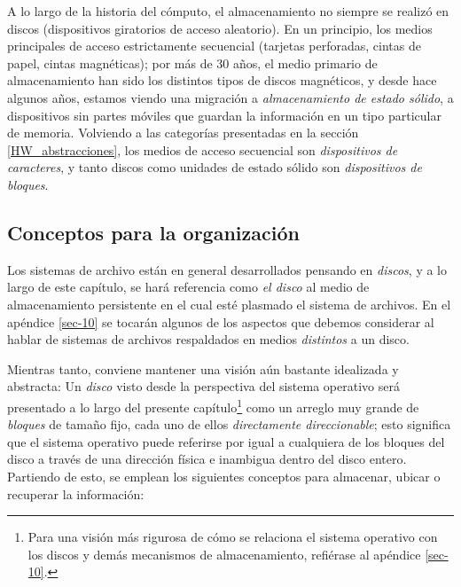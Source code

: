 \documentclass[11pt,fleqn]{book} %
\begin{document}
A lo largo de la historia del cómputo, el almacenamiento no siempre
se realizó en discos (dispositivos giratorios de acceso aleatorio). En
un principio, los medios principales de acceso estrictamente
secuencial (tarjetas perforadas, cintas de papel, cintas magnéticas);
por más de 30 años, el medio primario de almacenamiento han sido los
distintos tipos de discos magnéticos, y desde hace algunos años,
estamos viendo una migración a \emph{almacenamiento de estado sólido}, a
dispositivos sin partes móviles que guardan la información en un tipo
particular de memoria. Volviendo a las categorías presentadas en la
sección \ref{HW_abstracciones}, los medios de acceso secuencial son
\emph{dispositivos de caracteres}, y tanto discos como unidades de estado
sólido son \emph{dispositivos de bloques}.
\subsection{Conceptos para la organización}
\label{sec-7-1-1}
\label{FS_conceptos}


Los sistemas de archivo están en general desarrollados pensando en
\emph{discos}, y a lo largo de este capítulo, se hará referencia como \emph{el disco} al medio de almacenamiento persistente en el cual esté plasmado
el sistema de archivos. En el apéndice \ref{sec-10} se tocarán algunos
de los aspectos que debemos considerar al hablar de sistemas de
archivos respaldados en medios \emph{distintos} a un disco.

Mientras tanto, conviene mantener una visión aún bastante idealizada y
abstracta: Un \emph{disco} visto desde la perspectiva del sistema operativo
será presentado a lo largo del presente capítulo\footnote{Para una visión
más rigurosa de cómo se relaciona el sistema operativo con los discos
y demás mecanismos de almacenamiento, refiérase al apéndice
\ref{sec-10}. } como un arreglo muy grande de \emph{bloques} de tamaño
fijo, cada uno de ellos \emph{directamente direccionable}; esto significa
que el sistema operativo puede referirse por igual a cualquiera de los
bloques del disco a través de una dirección física e inambigua dentro
del disco entero. Partiendo de esto, se emplean los siguientes
conceptos para almacenar, ubicar o recuperar la información:
\end{document}
